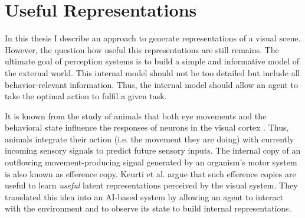 
\section{Useful Representations}
In this thesis I describe an approach to generate representations of a visual scene.
However, the question how useful this representations are still remains.
The ultimate goal of perception systems is to build a simple and informative model of the external world.
This internal model should not be too detailed but include all behavior-relevant information.
Thus, the internal model should allow an agent to take the optimal action to fulfil a given task.

It is known from the study of animals that both eye movements and the behavioral state influence the responses of neurons in the visual cortex .
Thus, animals integrate their action (i.e. the movement they are doing) with currently incoming sensory signals to predict future sensory inputs.
The internal copy of an outflowing movement-producing signal generated by an organism's motor system is also known as efference copy.
Keurti et al.  argue that such efference copies are useful to learn \emph{useful} latent representations perceived by the visual system.
They translated this idea into an AI-based system by allowing an agent to interact with the environment and to observe its state to build internal representations.

